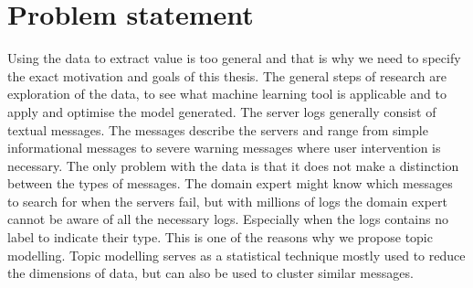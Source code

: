 \begin{comment}
--todo--
The intention of this research started with analysing e system logs to help create a model for predicting hardware and software failure for maintenance and automatic self-healing. The huge amount of system logs available from a variety of systems brought the question how to analyse and make use of the logs to predict hardware and software failure.

Current research of big data makes this a suitable problem to solve through recent machine learning techniques. 
During the time spent on this research challenges were met and identified for realising this goal and ended with the usage of Natural Language Processing (NLP) and unsupervised learning.  The untapped amount of raw data makes it possible for many more application, but in further paragraphs it will be made clear why NLP was chosen and what more could be applied on this Big data problem.

\end{comment}
 
\section{Problem statement}\label{introduction:Motivation}
Using the data to extract value is too general and that is why we need to specify the exact motivation and goals of this thesis. The general steps of research are exploration of the data, to see what machine learning tool is applicable and to apply and optimise the model generated. The server logs generally consist of textual messages. The messages describe the servers and range from simple informational messages to severe warning messages where user intervention is necessary. The only problem with the data is that it does not make a distinction between the types of messages. The domain expert might know which messages to search for when the servers fail, but with millions of logs the domain expert cannot be aware of all the necessary logs. Especially when the logs contains no label to indicate their type. This is one of the reasons why we propose topic modelling. Topic modelling serves as a statistical technique mostly used to reduce the dimensions of data, but can also be used to cluster similar messages.

\begin{comment}

Topic modelling is a hot topic in data science. System logs are used as source for the detection of problems in large computer systems. While domain experts can be used to detect and fix the problems detected, this can be difficult and time consuming. Machine learning techniques like topic modelling make it possible to develop models to extract these latent patterns from these system logs. While topic modelling is normally used in for large text corpera, recent research in the field of short text clustering and twitter tweets clustering are similar enough to by applicable for system logs. An interesting application which has not yet been touched a lot through unsupervised machine learning techniques.

\end{comment}

